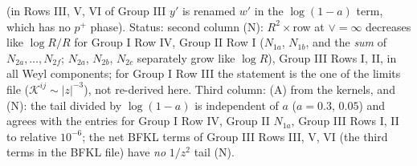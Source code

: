 \documentclass[9pt]{article}
\numberwithin{equation}{section}
\begin{document}
(in Rows III, V, VI of Group III $y'$ is renamed $w'$ in the $\log(1-a)$ term, which has no $p^{+}$ phase). Status: second column (N): $R^{2}\times$row at $\vee=\infty$ decreases like $\log R/R$ for Group I Row IV, Group II Row I ($N_{1a}$, $N_{1b}$, and the \emph{sum} of $N_{2a},\dots,N_{2f}$; $N_{2a}$, $N_{2b}$, $N_{2c}$ separately grow like $\log R$), Group III Rows I, II, in all Weyl components; for Group I Row III the statement is the one of the limits file ($\mathcal K^{ij}\sim|z|^{-3}$), not re-derived here. Third column: (A) from the kernels, and (N): the tail divided by $\log(1-a)$ is independent of $a$ ($a=0.3$, $0.05$) and agrees with the entries for Group I Row IV, Group II $N_{1a}$, Group III Rows I, II to relative $10^{-6}$; the net BFKL terms of Group III Rows III, V, VI (the third terms in the BFKL file) have \emph{no} $1/z^{2}$ tail (N).
\end{document}
